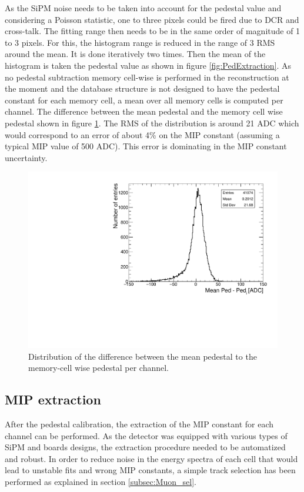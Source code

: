As the SiPM noise needs to be taken into account for the pedestal value and considering a Poisson statistic, one to three pixels could be fired due to DCR and cross-talk. The fitting range then needs to be in the same order of magnitude of 1 to 3 pixels. For this, the histogram range is reduced in the range of 3 RMS around the mean. It is done iteratively two times. Then the mean of the histogram is taken the pedestal value as shown in figure \ref{fig:PedExtraction}. As no pedestal subtraction memory cell-wise is performed in the reconstruction at the moment and the database structure is not designed to have the pedestal constant for each memory cell, a mean over all memory cells is computed per channel. The difference between the mean pedestal and the memory cell wise pedestal shown in figure \ref{fig:CompMeanMem}. The RMS of the distribution is around 21 ADC which would correspond to an error of about 4\% on the MIP constant (assuming a typical MIP value of 500 ADC). This error is dominating in the MIP constant uncertainty.

\begin{figure}[htbp!]
	\centering
	\includegraphics[width=0.7\linewidth]{../Thesis_Plots/EnergyCalib/Plots/ComparisonMeanPedtoMemorycell.pdf}
	\caption{Distribution of the difference between the mean pedestal to the memory-cell wise pedestal per channel.} \label{fig:CompMeanMem}
\end{figure}

\subsection{MIP extraction}

After the pedestal calibration, the extraction of the MIP constant for each channel can be performed. As the detector was equipped with various types of SiPM and boards designs, the extraction procedure needed to be automatized and robust. In order to reduce noise in the energy spectra of each cell that would lead to unstable fits and wrong MIP constants, a simple track selection has been performed as explained in section \ref{subsec:Muon_sel}.

